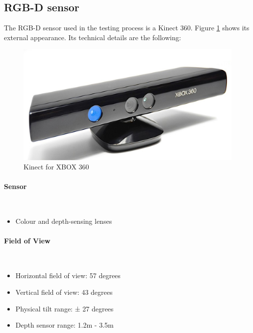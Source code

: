 \subsection{RGB-D sensor}
	The RGB-D sensor used in the testing process is a Kinect 360. 
	Figure \ref{kinect_image} shows its external appearance. 
	Its technical details are the following: 
	\begin{figure}[H]
		\begin{center}
	\includegraphics[scale=0.3]{img/kinect.eps}
		\caption[Kinect image]{Kinect for XBOX 360}
			\label{kinect_image}

		\end{center}
	\end{figure}
	\paragraph{ Sensor} \mbox{} \\
		\begin{itemize}
			\item Colour and depth-sensing lenses
		\end{itemize}
		\vspace*{0.5cm}

	\paragraph{ Field of View} \mbox{} \\
		\begin{itemize}

			\item Horizontal field of view: 57 degrees
			\item Vertical field of view: 43 degrees
			\item Physical tilt range: ± 27 degrees
			\item Depth sensor range: 1.2m - 3.5m
		\end{itemize}
		\vspace*{0.5cm}

